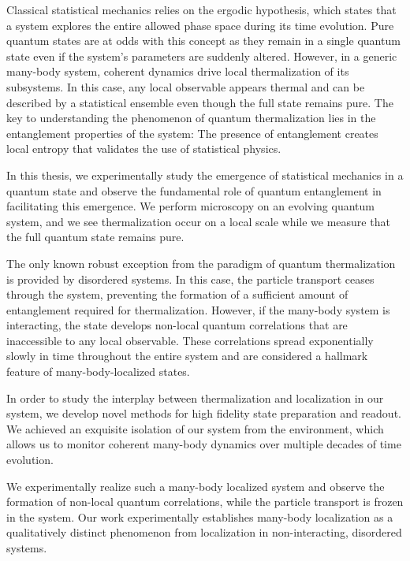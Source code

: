 
Classical statistical mechanics relies on the ergodic hypothesis, which states that a system explores the entire allowed phase space during its time evolution. Pure quantum states are at odds with this concept as they remain in a single quantum state even if the system's parameters are suddenly altered. However, in a generic many-body system, coherent dynamics drive local thermalization of its subsystems. In this case, any local observable appears thermal and can be described by a statistical ensemble even though the full state remains pure. The key to understanding the phenomenon of quantum thermalization lies in the entanglement properties of the system: The presence of entanglement creates local entropy that validates the use of statistical physics.

In this thesis, we experimentally study the emergence of statistical mechanics in a quantum state and observe the fundamental role of quantum entanglement in facilitating this emergence. We perform microscopy on an evolving quantum system, and we see thermalization occur on a local scale while we measure that the full quantum state remains pure.

The only known robust exception from the paradigm of quantum thermalization is provided by disordered systems. In this case, the particle transport ceases through the system, preventing the formation of a sufficient amount of entanglement required for thermalization. However, if the many-body system is interacting, the state develops non-local quantum correlations that are inaccessible to any local observable. These correlations spread exponentially slowly in time throughout the entire system and are considered a hallmark feature of many-body-localized states.

In order to study the interplay between thermalization and localization in our system, we develop novel methods for high fidelity state preparation and readout. We achieved an exquisite isolation of our system from the environment, which allows us to monitor coherent many-body dynamics over multiple decades of time evolution.

We experimentally realize such a many-body localized system and observe the formation of non-local quantum correlations, while the particle transport is frozen in the system. Our work experimentally establishes many-body localization as a qualitatively distinct phenomenon from localization in non-interacting, disordered systems.